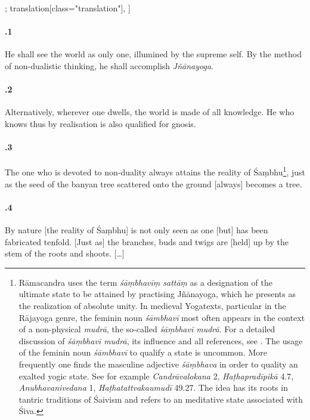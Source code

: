 \begin{alignment}[
  texts=edition[class="edition"];
  translation[class="translation"],
  ]
\begin{translation}
\begin{tlate}[21_1]
       \paragraph{.1} He shall see the world as only one, illumined by the supreme self. By the method of non-dualistic thinking, he shall accomplish \textit{Jñānayoga}.
     \end{tlate}
     \begin{tlate}[21_2]
       \paragraph{.2} Alternatively, wherever one dwells, the world is made of all knowledge. He who knows thus by realisation is also qualified for gnosis. %
     \end{tlate}
     \begin{tlate}[21_3]
       \paragraph{.3} The one who is devoted to non-duality always attains the reality of Śaṃbhu\footnote{Rāmacandra uses the term \textit{śāṃbhavīṃ sattāṃ} as a designation of the ultimate state to be attained by practising Jñānayoga, which he presents as the realization of absolute unity. In medieval Yogatexts, particular in the Rājayoga genre, the feminin noun \textit{śāmbhavī} most often appears in the context of a non-physical \textit{mudrā}, the so-called \textit{śāṃbhavī mudrā}. For a detailed discussion of \textit{śāṃbhavī mudrā}, its influence and all references, see \citeauthor[2013:71-79]{birch2013}. The usage of the feminin noun \textit{śāmbhavī} to qualify a state is uncommon. More frequently one finds the masculine adjective \textit{śāṃbhava} in order to quality an exalted yogic state. See for example \emph{Candrāvalokana} 2, \textit{Haṭhapradīpikā} 4.7, \emph{Anubhavanivedana} 1, \emph{Haṭhatattvakaumudī} 49.27. The idea has its roots in tantric traditions of Śaivism and refers to an meditative state associated with Śiva.}, just as the seed of the banyan tree scattered onto the ground [always] becomes a tree.
     \end{tlate}
     \begin{tlate}[21_4]
\paragraph{.4} By nature [the reality of Śaṃbhu] is not only seen as one [but] has been fabricated tenfold. [Just as] the branches, buds and twigs are [held] up by the stem of the roots and shoots. [\ldots]
\end{tlate}
    \begin{tlate}[21_5]

\end{tlate}
\end{translation}
\end{alignment}

